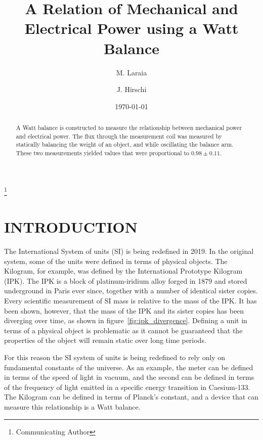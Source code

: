\documentclass[aps,prstab,reprint,12pt]{revtex4-1}
\begin{document}
\title{A Relation of Mechanical and Electrical Power using a Watt Balance}

\author{M. Laraia}
\thanks{Communicating Author}
\author{J. Hirschi}


\date{\today}

\begin{abstract}
A Watt balance is constructed to measure the relationship between mechanical power and electrical power. The flux through the measurement coil was measured by statically balancing the weight of an object, and while oscillating the balance arm. These two measurements yielded values that were proportional to $0.98 \pm 0.11$.
\end{abstract}

\maketitle

\section{INTRODUCTION}

The International System of units (SI) is being redefined in 2019. In the original system, some of the units were defined in terms of physical objects. The Kilogram, for example, was defined by the International Prototype Kilogram (IPK). The IPK is a block of platinum-iridium alloy forged in 1879 and stored underground in Paris ever since, together with a number of identical sister copies. Every scientific measurement of SI mass is relative to the mass of the IPK. It has been shown, however, that the mass of the IPK and its sister copies has been diverging over time, as shown in figure~\ref{fig:ipk_divergence}. Defining a unit in terms of a physical object is problematic as it cannot be guaranteed that the properties of the object will remain static over long time periods.

For this reason the SI system of units is being redefined to rely only on fundamental constants of the universe. As an example, the meter can be defined in terms of the speed of light in vacuum, and the second can be defined in terms of the frequency of light emitted in a specific energy transition in Caesium-133.
The Kilogram can be defined in terms of Planck's constant, and a device that can measure this relationship is a Watt balance.
\end{document}
